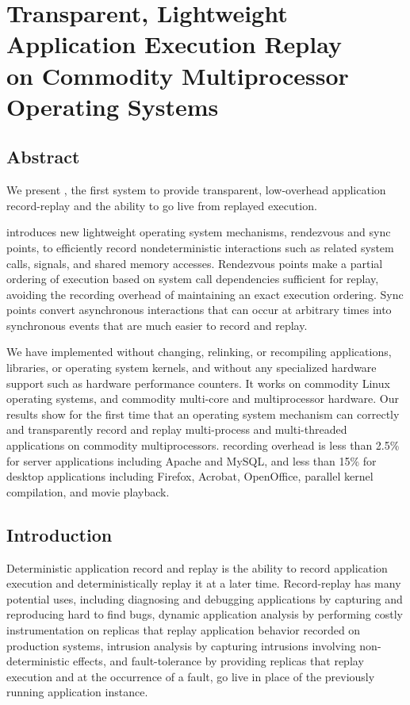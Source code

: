 \chapter{Transparent, Lightweight Application Execution Replay \\
on Commodity Multiprocessor Operating Systems}
\label{ch:scribe}

\section{Abstract}

We present \scribe{}, the first system to provide transparent,
low-overhead application record-replay and the ability to go live from
replayed execution.

\scribe{} introduces new lightweight operating system mechanisms,
rendezvous and sync points, to efficiently record nondeterministic
interactions such as related system calls, signals, and shared memory
accesses.  Rendezvous points make a partial ordering of execution
based on system call dependencies sufficient for replay, avoiding the
recording overhead of maintaining an exact execution ordering.  Sync
points convert asynchronous interactions that can occur at arbitrary
times into synchronous events that are much easier to record and
replay.

We have implemented \scribe{} without changing, relinking, or
recompiling applications, libraries, or operating system kernels, and
without any specialized hardware support such as hardware performance
counters.  It works on commodity Linux operating systems, and commodity
multi-core and multiprocessor hardware.  Our results show for the
first time that an operating system mechanism can correctly and
transparently record and replay multi-process and multi-threaded
applications on commodity multiprocessors.  \scribe{} recording overhead
is less than 2.5\% for server applications including Apache and MySQL,
and less than 15\% for desktop applications including Firefox,
Acrobat, OpenOffice, parallel kernel compilation, and movie playback.

\section{Introduction}

Deterministic application record and replay is the ability to record
application execution and deterministically replay it at a later time.
Record-replay has many potential uses, including diagnosing
and debugging applications by capturing and reproducing hard to find
bugs, dynamic application analysis by performing costly
instrumentation on replicas that replay application behavior recorded
on production systems, intrusion analysis by capturing intrusions involving
non-deterministic effects, and fault-tolerance by providing
replicas that replay execution and at the occurrence of a fault, go
live in place of the previously running application instance.  

